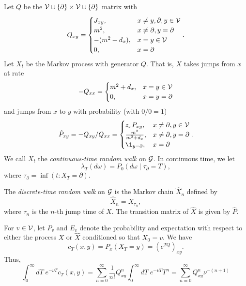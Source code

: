 Let $Q$ be the $\mathcal{V}\cup\{\partial\}\times\mathcal{V}\cup\{\partial\}$ matrix with
\begin{equation}
Q_{xy}
  =
\begin{cases}
J_{xy},       & x \ne y, \partial, y \in \mathcal{V} \\
m^2,          & x \ne \partial, y = \partial \\
-(m^2 + d_x), & x = y \in \mathcal{V} \\
0,            & x = \partial
\end{cases}.
\end{equation}
Let $X_t$ be the Markov process with generator $Q$.
That is, $X$ takes jumps from $x$ at rate
\begin{equation}
-Q_{xx}
  =
\begin{cases}
m^2 + d_x,    & x = y \in \mathcal{V} \\
0,            & x = y = \partial
\end{cases}
\end{equation}
and jumps from $x$ to $y$ with probability (with $0/0 = 1$)
\begin{equation}
\hat P_{xy}
  =
-Q_{xy} / Q_{xx}
  =
\begin{cases}
z_x P_{xy},             & x \ne \partial, y \in \vertices \\
\frac{m^2}{m^2 + d_x},  & x \ne \partial, y = \partial \\
\1_{y=\partial},        & x = \partial
\end{cases}.
\end{equation}
We call $X_t$ the \emph{continuous-time random walk} on $\mathcal{G}$.
In continuous time, we let
\begin{equation}
\lambda_T(d\omega) = P_0(d\omega \mid \tau_\partial = T),
\end{equation}
where $\tau_\partial = \inf(t : X_T = \partial)$.

The \emph{discrete-time random walk} on $\mathcal{G}$ is the Markov chain
$\hat X_n$ defined by
\begin{equation}
\hat X_n = X_{\tau_n},
\end{equation}
where $\tau_n$ is the $n$-th jump time of $X$. The transition matrix of
$\hat X$ is given by $\hat P$.

For $v \in \mathcal{V}$, let $P_v$ and $E_v$ denote the probability and expectation
with respect to either the process $X$ or $\hat X$ conditioned so that $X_0 = v$.
We have
\begin{equation}
c_T(x, y) = P_x (X_T = y) = (e^{T Q})_{xy}.
\end{equation}
Thus,
\begin{equation}
\int_0^\infty dT \; e^{-\nu T} c_T(x, y)
  =
\sum_{n=0}^\infty \frac{1}{n!} Q^n_{xy} \int_0^\infty dT \; e^{-\nu T} T^n
  =
\sum_{n=0}^\infty Q^n_{xy} \nu^{-(n+1)}
\end{equation}

